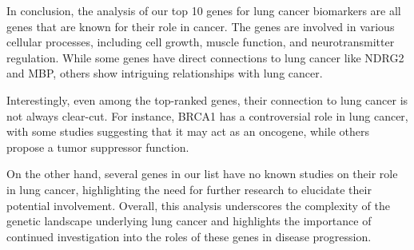 In conclusion, the analysis of our top 10 genes for lung cancer biomarkers are all genes that are known for their role in cancer.
The genes are involved in various cellular processes, including cell growth, muscle function, and neurotransmitter regulation.
While some genes have direct connections to lung cancer like NDRG2 and MBP,
others show intriguing relationships with lung cancer.

Interestingly, even among the top-ranked genes, their connection to lung cancer is not always clear-cut.
For instance, BRCA1 has a controversial role in lung cancer, with some studies suggesting that it may act as an oncogene,
while others propose a tumor suppressor function.

On the other hand, several genes in our list have no known studies on their role in lung cancer,
highlighting the need for further research to elucidate their potential involvement.
Overall, this analysis underscores the complexity of the genetic landscape underlying lung cancer and
highlights the importance of continued investigation into the roles of these genes in disease progression.